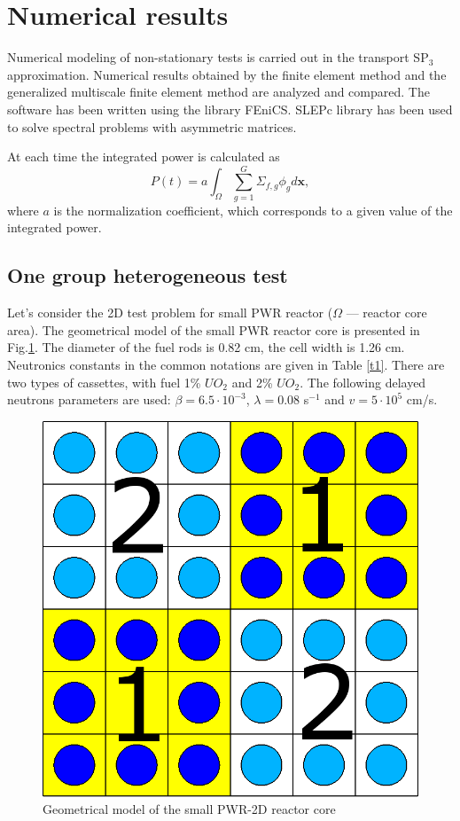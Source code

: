 \documentclass[authoryear]{elsarticle}
\begin{document}
\section{Numerical results}
Numerical modeling of non-stationary tests is carried out in the transport SP$_3$ approximation.
Numerical results obtained by the finite element method and the generalized multiscale finite element method are analyzed and compared.
The software has been written using the library FEniCS.
SLEPc library has been used to solve spectral problems with asymmetric matrices.

At each time the integrated power is calculated as
	\[P(t) = a \int_{\Omega} \sum_{g=1}^{G} \Sigma_{f,g} \phi_g d \bm x,\]
where $a$ is the normalization coefficient, which corresponds to a given value of the integrated power.

\subsection{One group heterogeneous test}
Let's consider the 2D test problem for small PWR reactor ($\Omega$ --- reactor core area). 
The geometrical model of the small PWR reactor core is presented in Fig.\ref{p3}. 
The diameter of the fuel rods is 0.82 cm, the cell width is 1.26 cm.
Neutronics constants in the common notations are given in Table \ref{t1}. 
There are two types of cassettes, with fuel 1\% $UO_2$ and 2\% $UO_2$.
The following delayed neutrons parameters are used: $\beta = 6.5 \cdot 10^{-3}$, $\lambda = 0.08$ s$^{-1}$ and $v = 5 \cdot 10^5$ cm/s.

\begin{figure}[ht]
	\centering
	    \includegraphics[width=0.5\linewidth] {smallpwr.png}
	\caption{Geometrical model of the small PWR-2D reactor core}
	\label{p3}
\end{figure} 
\end{document}

